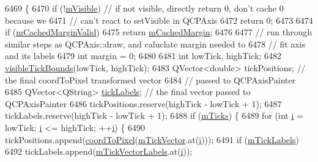 \begin{DoxyCode}
6469                              \{
6470   \textcolor{keywordflow}{if} (!\hyperlink{class_q_c_p_layerable_a62e3aed8427d6ce3ccf716f285106cb3}{mVisible}) \textcolor{comment}{// if not visible, directly return 0, don't cache 0 because we}
6471                  \textcolor{comment}{// can't react to setVisible in QCPAxis}
6472     \textcolor{keywordflow}{return} 0;
6473 
6474   \textcolor{keywordflow}{if} (\hyperlink{class_q_c_p_axis_a2cde37b6e385f47e11322df4ac1b0e9b}{mCachedMarginValid})
6475     \textcolor{keywordflow}{return} \hyperlink{class_q_c_p_axis_a48ace55cbd54f7241e7f1b06fd369b64}{mCachedMargin};
6476 
6477   \textcolor{comment}{// run through similar steps as QCPAxis::draw, and caluclate margin needed to}
6478   \textcolor{comment}{// fit axis and its labels}
6479   \textcolor{keywordtype}{int} margin = 0;
6480 
6481   \textcolor{keywordtype}{int} lowTick, highTick;
6482   \hyperlink{class_q_c_p_axis_a06320a944d1120732cc0d72fe1306d8b}{visibleTickBounds}(lowTick, highTick);
6483   QVector<double> tickPositions; \textcolor{comment}{// the final coordToPixel transformed vector}
6484                                  \textcolor{comment}{// passed to QCPAxisPainter}
6485   QVector<QString> \hyperlink{class_q_c_p_axis_a9a78fcccd98a73d37b3d991df7b6ef1d}{tickLabels};   \textcolor{comment}{// the final vector passed to QCPAxisPainter}
6486   tickPositions.reserve(highTick - lowTick + 1);
6487   tickLabels.reserve(highTick - lowTick + 1);
6488   \textcolor{keywordflow}{if} (\hyperlink{class_q_c_p_axis_ab111e74bba22e06848897c932fc549fe}{mTicks}) \{
6489     \textcolor{keywordflow}{for} (\textcolor{keywordtype}{int} \hyperlink{_comparision_pictures_2_createtest_image_8m_a6f6ccfcf58b31cb6412107d9d5281426}{i} = lowTick; \hyperlink{_comparision_pictures_2_createtest_image_8m_a6f6ccfcf58b31cb6412107d9d5281426}{i} <= highTick; ++\hyperlink{_comparision_pictures_2_createtest_image_8m_a6f6ccfcf58b31cb6412107d9d5281426}{i}) \{
6490       tickPositions.append(\hyperlink{class_q_c_p_axis_a985ae693b842fb0422b4390fe36d299a}{coordToPixel}(\hyperlink{class_q_c_p_axis_aae0f9b9973b85be601200f00f5825087}{mTickVector}.at(\hyperlink{_comparision_pictures_2_createtest_image_8m_a6f6ccfcf58b31cb6412107d9d5281426}{i})));
6491       \textcolor{keywordflow}{if} (\hyperlink{class_q_c_p_axis_a3e4315be072026644e69009557a2fa11}{mTickLabels})
6492         tickLabels.append(\hyperlink{class_q_c_p_axis_aeee4bd0fca3f587eafe33843d1cb4f82}{mTickVectorLabels}.at(\hyperlink{_comparision_pictures_2_createtest_image_8m_a6f6ccfcf58b31cb6412107d9d5281426}{i}));

\end{DoxyCode}

